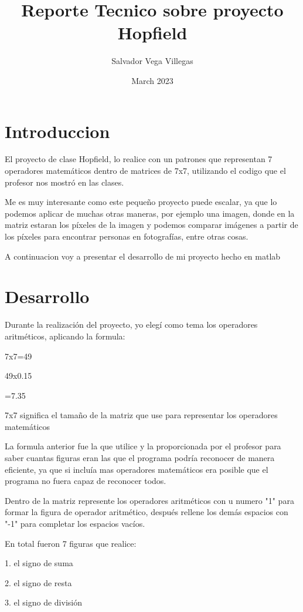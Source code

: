 \documentclass{article}
\title{Reporte Tecnico sobre proyecto Hopfield}
\author{Salvador Vega Villegas }
\date{March 2023}
\begin{document}
\maketitle

\section{Introduccion}
El proyecto de clase Hopfield, lo realice con un patrones que representan 7 operadores matemáticos dentro de matrices de 7x7, utilizando el codigo que el profesor nos mostró en las clases.




Me es muy interesante como este pequeño proyecto puede escalar, ya que lo podemos aplicar de muchas otras maneras, por ejemplo una imagen, donde en la matriz estaran los píxeles de la imagen y podemos comparar imágenes a partir de los píxeles para encontrar personas en fotografías, entre otras cosas.




A continuacion voy a presentar el desarrollo de mi proyecto hecho en matlab
 
\section{Desarrollo}

Durante la realización del proyecto, yo elegí como tema los operadores aritméticos, aplicando la formula:

7x7=49 

49x0.15

=7.35

7x7 significa el tamaño de la matriz que use para representar los operadores matemáticos

La formula anterior fue la que utilice y la proporcionada por el profesor para saber cuantas figuras eran las que el programa podría reconocer de manera eficiente, ya que si incluía mas operadores matemáticos era posible que el programa no fuera capaz de reconocer todos.


Dentro de la matriz represente los operadores aritméticos con u numero "1" para formar la figura de operador aritmético, después rellene los demás espacios con "-1" para completar los espacios vacíos.

En total fueron 7 figuras que realice:

1. el signo de suma

2. el signo de resta

3. el signo de división
\end{document}
